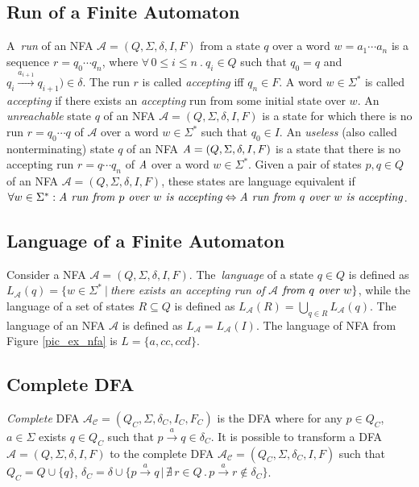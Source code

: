 	\subsection{Run of a Finite Automaton}
	\label{defRun}
  A~\emph{run} of an NFA $\mathcal{A}=(Q,\Sigma,\delta,I,F)$ from a state $q$
  over a word $w=a_1\cdots a_n$ is a sequence $r = q_0 \cdots q_n$, where $\forall\,0\leq i \leq n\ .\ q_i\in Q$ 
  such that $q_0=q$ and $q_i\xrightarrow{a_{i+1}}q_{i+1})\in \delta$. 
  The run $r$ is called \emph{accepting} iff $q_n \in F$. 
	A word $w \in \Sigma^{*}$ is called \emph{accepting} if there exists an \emph{accepting} run from some initial state over $w$.
  An \emph{unreachable} state $q$ of an NFA $\mathcal{A}=(Q,\Sigma,\delta,I,F)$ is a state for which there is no run $r=q_0\cdots q$ of 
  $\mathcal{A}$ over a word $w \in \Sigma^{*}$ such that $q_0\in I$.
  An \emph{useless} (also called nonterminating) state $q$ of an NFA $\emph{A}=(Q,\Sigma,\delta,I,F)$ is a state that there is no accepting run $r=q\cdots q_n$ 
  of $\emph{A}$ over a word $w \in \Sigma^{*}$.
  Given a pair of states $p,q\in Q$ of an NFA $\mathcal{A}=(Q,\Sigma,\delta,I,F)$, these states are language equivalent if 
  $\forall w \in \Sigma^{*}: \emph{A run from } p \emph{ over } w \emph{ is accepting} \Leftrightarrow 
			\emph{A run from } q \emph{ over } w \emph{ is accepting}$.


  \subsection{Language of a Finite Automaton}
  Consider a NFA $\mathcal{A}=(Q,\Sigma,\delta,I,F)$.
  The~\emph{language} of a state $q \in Q$ is defined as 
  $L_\mathcal{A}(q) = \{w\in \Sigma^{*}\ |\ $\emph{there exists an accepting run of }$
  \mathcal{A}$$ 
  \emph{ from }q\emph{ over }w\}$, while the language of a set of states $R\subseteq Q$ is defined as $L_{\mathcal{A}}(R)=\bigcup_{q\in R}L_{\mathcal{A}}(q)$.
  The language of an NFA $\mathcal{A}$ is defined as $L_{\mathcal{A}}=L_{\mathcal{A}}(I)$.
  The language of NFA from Figure \ref{pic_ex_nfa} is $L=\{a,cc,ccd\}$.

  \subsection{Complete DFA}
  \label{defCompleteDFA}
  \emph{Complete} DFA $\mathcal{A_C}=(Q_C,\Sigma,\delta_C,I_C,F_C)$ is the DFA where 
  for any $p\in Q_C$, $a\in \Sigma$ exists $q\in Q_C$ such that  $p\xrightarrow{a}q\in\delta_C$. 
  It is possible to transform a DFA $\mathcal{A}=(Q,\Sigma,\delta,I,F)$ to the complete DFA $\mathcal{A_C}=(Q_C,\Sigma,\delta_C,I,F)$ such that $Q_C=Q\cup\{q\}$, 
  $\delta_C = \delta \cup \{p\xrightarrow{a}q\,|\,\nexists\, r \in Q\,.\,p\xrightarrow{a}r\not\in\delta_C\}$.

